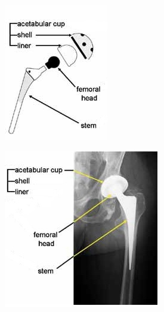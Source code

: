 \documentclass[whitelogo]{tudelft-report}
\begin{document}
{\begin{figure}[ht]
\begin{subfigure}{0.31\linewidth}
		\centering\includegraphics[width=1\linewidth]{schematic_scheme_hip_prosthetic.jpg}
		\caption{\label{fig:fig1}}
	\end{subfigure}%
	\begin{subfigure}{0.31\linewidth}
		\centering\includegraphics[width=1\linewidth]{Xray_hip_prosthetic.jpg}

\end{subfigure}
\end{figure}}
\end{document}

